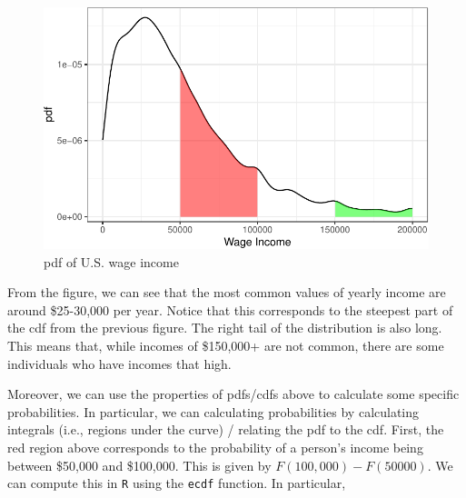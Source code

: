\documentclass[
  letterpaper,
  DIV=11,
  numbers=noendperiod]{scrreprt}
\newenvironment{Shaded}{\begin{snugshade}}{\end{snugshade}}
\newcommand{\DecValTok}[1]{\textcolor[rgb]{0.68,0.00,0.00}{#1}}
\newcommand{\FunctionTok}[1]{\textcolor[rgb]{0.28,0.35,0.67}{#1}}
\newcommand{\NormalTok}[1]{\textcolor[rgb]{0.00,0.23,0.31}{#1}}
\newcommand{\OtherTok}[1]{\textcolor[rgb]{0.00,0.23,0.31}{#1}}
\newcommand{\SpecialCharTok}[1]{\textcolor[rgb]{0.37,0.37,0.37}{#1}}
\begin{document}
\begin{figure}[H]

{\centering \includegraphics{02-probability_files/figure-pdf/unnamed-chunk-6-1.pdf}

}

\caption{pdf of U.S. wage income}

\end{figure}%

From the figure, we can see that the most common values of yearly income
are around \$25-30,000 per year. Notice that this corresponds to the
steepest part of the cdf from the previous figure. The right tail of the
distribution is also long. This means that, while incomes of \$150,000+
are not common, there are some individuals who have incomes that high.

Moreover, we can use the properties of pdfs/cdfs above to calculate some
specific probabilities. In particular, we can calculating probabilities
by calculating integrals (i.e., regions under the curve) / relating the
pdf to the cdf. First, the red region above corresponds to the
probability of a person's income being between \$50,000 and \$100,000.
This is given by \(F(100,000) - F(50000)\). We can compute this in
\texttt{R} using the \texttt{ecdf} function. In particular,

\begin{Shaded}
\end{Shaded}
\end{document}

